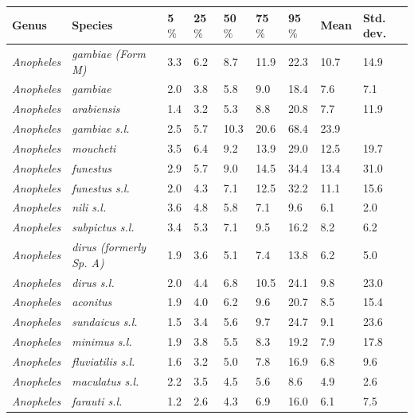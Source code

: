 \documentclass[12pt]{article}
\begin{document}
\begin{table}[htbp!]
	\begin{tabular}{l|l|l|l|l|l|l|l|l}
		\textbf{Genus} & \textbf{Species} & \textbf{5$\%$} & \textbf{25$\%$} & \textbf{50$\%$} &
		\textbf{75$\%$} & \textbf{95$\%$} & \textbf{Mean} & \textbf{Std. dev.} \\
		\hline
		\textit{Anopheles} & \textit{gambiae (Form M)} & 3.3 & 6.2 & 8.7 & 11.9 & 22.3 & 10.7 & 14.9
		\\
		\textit{Anopheles} & \textit{gambiae} & 2.0 & 3.8 & 5.8 & 9.0 & 18.4 & 7.6 & 7.1 \\
		\textit{Anopheles} & \textit{arabiensis} & 1.4 & 3.2 & 5.3 & 8.8 & 20.8 & 7.7 & 11.9 \\
		\textit{Anopheles} & \textit{gambiae s.l.} & 2.5 & 5.7 & 10.3 & 20.6 & 68.4 & 23.9 &
		\text{$>$100} \\
		\textit{Anopheles} & \textit{moucheti} & 3.5 & 6.4 & 9.2 & 13.9 & 29.0 & 12.5 & 19.7 \\
		\textit{Anopheles} & \textit{funestus} & 2.9 & 5.7 & 9.0 & 14.5 & 34.4 & 13.4 & 31.0 \\
		\textit{Anopheles} & \textit{funestus s.l.} & 2.0 & 4.3 & 7.1 & 12.5 & 32.2 & 11.1 & 15.6 \\
		\textit{Anopheles} & \textit{nili s.l.} & 3.6 & 4.8 & 5.8 & 7.1 & 9.6 & 6.1 & 2.0 \\
		\textit{Anopheles} & \textit{subpictus s.l.} & 3.4 & 5.3 & 7.1 & 9.5 & 16.2 & 8.2 & 6.2 \\
		\textit{Anopheles} & \textit{dirus (formerly Sp. A)} & 1.9 & 3.6 & 5.1 & 7.4 & 13.8 & 6.2 &
		5.0 \\
		\textit{Anopheles} & \textit{dirus s.l.} & 2.0 & 4.4 & 6.8 & 10.5 & 24.1 & 9.8 & 23.0 \\
		\textit{Anopheles} & \textit{aconitus} & 1.9 & 4.0 & 6.2 & 9.6 & 20.7 & 8.5 & 15.4 \\
		\textit{Anopheles} & \textit{sundaicus s.l.} & 1.5 & 3.4 & 5.6 & 9.7 & 24.7 & 9.1 & 23.6 \\
		\textit{Anopheles} & \textit{minimus s.l.} & 1.9 & 3.8 & 5.5 & 8.3 & 19.2 & 7.9 & 17.8 \\
		\textit{Anopheles} & \textit{fluviatilis s.l.} & 1.6 & 3.2 & 5.0 & 7.8 & 16.9 & 6.8 & 9.6 \\
		\textit{Anopheles} & \textit{maculatus s.l.} & 2.2 & 3.5 & 4.5 & 5.6 & 8.6 & 4.9 & 2.6 \\
		\textit{Anopheles} & \textit{farauti s.l.} & 1.2 & 2.6 & 4.3 & 6.9 & 16.0 & 6.1 & 7.5 \\

\end{tabular}
\end{table}
\end{document}
